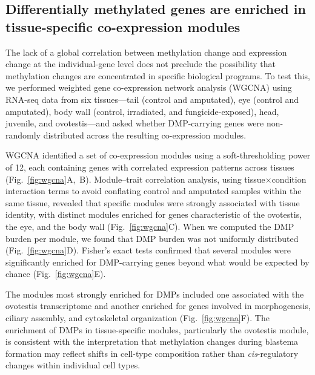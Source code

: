\documentclass[12pt]{article}
\begin{document}

\subsection*{Differentially methylated genes are enriched in tissue-specific co-expression modules}

The lack of a global correlation between methylation change and expression change at the individual-gene level does not preclude the possibility that methylation changes are concentrated in specific biological programs. To test this, we performed weighted gene co-expression network analysis (WGCNA) using RNA-seq data from six tissues---tail (control and amputated), eye (control and amputated), body wall (control, irradiated, and fungicide-exposed), head, juvenile, and ovotestis---and asked whether DMP-carrying genes were non-randomly distributed across the resulting co-expression modules.

WGCNA identified a set of co-expression modules using a soft-thresholding power of 12, each containing genes with correlated expression patterns across tissues (Fig.~\ref{fig:wgcna}A,~B). Module--trait correlation analysis, using tissue$\times$condition interaction terms to avoid conflating control and amputated samples within the same tissue, revealed that specific modules were strongly associated with tissue identity, with distinct modules enriched for genes characteristic of the ovotestis, the eye, and the body wall (Fig.~\ref{fig:wgcna}C). When we computed the DMP burden per module, we found that DMP burden was not uniformly distributed (Fig.~\ref{fig:wgcna}D). Fisher's exact tests confirmed that several modules were significantly enriched for DMP-carrying genes beyond what would be expected by chance (Fig.~\ref{fig:wgcna}E).

The modules most strongly enriched for DMPs included one associated with the ovotestis transcriptome and another enriched for genes involved in morphogenesis, ciliary assembly, and cytoskeletal organization (Fig.~\ref{fig:wgcna}F). The enrichment of DMPs in tissue-specific modules, particularly the ovotestis module, is consistent with the interpretation that methylation changes during blastema formation may reflect shifts in cell-type composition rather than \textit{cis}-regulatory changes within individual cell types.
\end{document}
